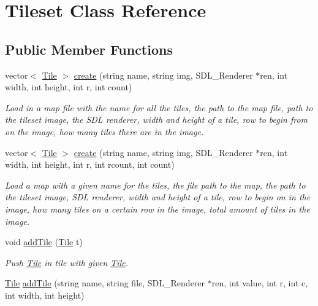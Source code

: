 \hypertarget{classTileset}{}\section{Tileset Class Reference}
\label{classTileset}
\subsection*{Public Member Functions}
\begin{DoxyCompactItemize}
\item 
vector$<$ \hyperlink{classTile}{Tile} $>$ \hyperlink{classTileset_ad11cd044d9a2907003fee3baacba86e7}{create} (string name, string img, S\+D\+L\+\_\+\+Renderer $\ast$ren, int width, int height, int r, int count)\hypertarget{classTileset_ad11cd044d9a2907003fee3baacba86e7}{}\label{classTileset_ad11cd044d9a2907003fee3baacba86e7}

\begin{DoxyCompactList}\small\item\em Load in a map file with the name for all the tiles, the path to the map file, path to the tileset image, the S\+DL renderer, width and height of a tile, row to begin from on the image, how many tiles there are in the image. \end{DoxyCompactList}\item 
vector$<$ \hyperlink{classTile}{Tile} $>$ \hyperlink{classTileset_a1435c7ce70c5aa6da6388762971917aa}{create} (string name, string img, S\+D\+L\+\_\+\+Renderer $\ast$ren, int width, int height, int r, int rcount, int count)\hypertarget{classTileset_a1435c7ce70c5aa6da6388762971917aa}{}\label{classTileset_a1435c7ce70c5aa6da6388762971917aa}

\begin{DoxyCompactList}\small\item\em Load a map with a given name for the tiles, the file path to the map, the path to the tileset image, S\+DL renderer, width and height of a tile, row to begin on in the image, how many tiles on a certain row in the image, total amount of tiles in the image. \end{DoxyCompactList}\item 
void \hyperlink{classTileset_a26acaabd06601aba2e277fdd2b750fc7}{add\+Tile} (\hyperlink{classTile}{Tile} t)\hypertarget{classTileset_a26acaabd06601aba2e277fdd2b750fc7}{}\label{classTileset_a26acaabd06601aba2e277fdd2b750fc7}

\begin{DoxyCompactList}\small\item\em Push \hyperlink{classTile}{Tile} in tile with given \hyperlink{classTile}{Tile}. \end{DoxyCompactList}\item 
\hyperlink{classTile}{Tile} \hyperlink{classTileset_aea4085286f450afdb53b22c917a77cba}{add\+Tile} (string name, string file, S\+D\+L\+\_\+\+Renderer $\ast$ren, int value, int r, int c, int width, int height)\hypertarget{classTileset_aea4085286f450afdb53b22c917a77cba}{}\label{classTileset_aea4085286f450afdb53b22c917a77cba}


\end{DoxyCompactItemize}
